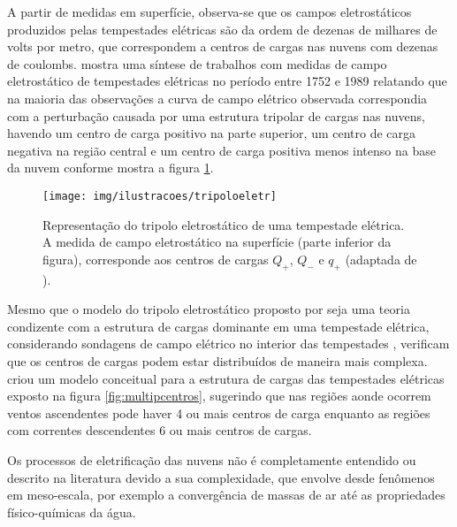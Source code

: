 A partir de medidas em superfície, observa-se que os campos eletrostáticos produzidos pelas tempestades elétricas são da ordem de dezenas de milhares de volts por metro, que correspondem a centros de cargas nas nuvens com dezenas de coulombs. 
 mostra uma síntese de trabalhos com medidas de campo eletrostático de tempestades elétricas no período entre 1752 e 1989 relatando que na maioria das observações a curva de campo elétrico observada correspondia com a perturbação causada por uma estrutura tripolar de cargas nas nuvens, havendo um centro de carga positivo na parte superior, um centro de carga negativa na região central e um centro de carga positiva menos intenso na base da nuvem conforme mostra a figura \ref{fig:tripeletr}.


\begin{figure}[htp]
\centering 
\texttt{[image: img/ilustracoes/tripoloeletr]}
\caption{Representação do tripolo eletrostático de uma tempestade elétrica. A medida de campo eletrostático na superfície (parte inferior da figura), corresponde aos centros de cargas $Q_{+}$, $Q_{-}$ e $q_{+}$ (adaptada de ).}
\label{fig:tripeletr}
\end{figure}

Mesmo que o modelo do tripolo eletrostático proposto por  seja uma teoria condizente com a estrutura de cargas dominante em uma tempestade elétrica, considerando sondagens de campo elétrico no interior das tempestades , verificam que os centros de cargas podem estar distribuídos de maneira mais complexa. 
 criou um modelo conceitual para a estrutura de cargas das tempestades elétricas exposto na figura \ref{fig:multipcentros}, sugerindo que nas regiões aonde ocorrem ventos ascendentes pode haver 4 ou mais centros de carga enquanto as regiões com correntes descendentes 6 ou mais centros de cargas.



Os processos de eletrificação das nuvens não é completamente entendido ou descrito na literatura devido a sua complexidade, que envolve desde fenômenos em meso-escala, por exemplo a convergência de massas de ar até as propriedades físico-químicas da água.  


